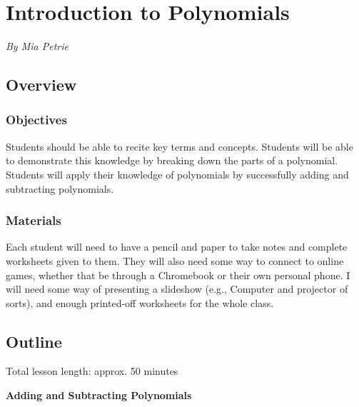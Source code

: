 \chapter{Introduction to Polynomials}

\emph{By Mia Petrie}

\section{Overview}

\subsection{Objectives}

\begin{outline}
    \1 Students should be able to recite key terms and concepts.
    \1 Students will be able to demonstrate this knowledge by breaking down the parts of a polynomial.
    \1 Students will apply their knowledge of polynomials by successfully adding and subtracting polynomials.
\end{outline}

\subsection{Materials}

Each student will need to have a pencil and paper to take notes and complete worksheets given to them. They will also need some way to connect to online games, whether that be through a Chromebook or their own personal phone. I will need some way of presenting a slideshow (e.g., Computer and projector of sorts), and enough printed-off worksheets for the whole class.

\section{Outline}


Total lesson length: approx. 50 minutes

\textbf{Adding and Subtracting Polynomials}

